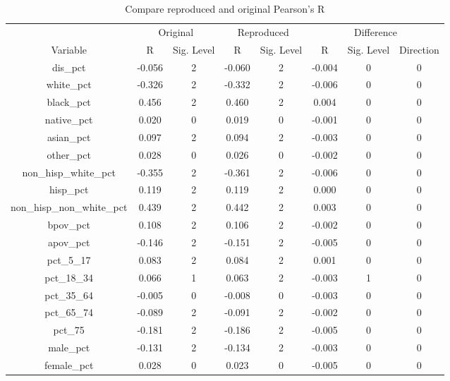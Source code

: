 \documentclass[
]{article}
\begin{document}
\begin{table}

\caption{\label{tab:compare-pearsons-correlation}Compare reproduced and original Pearson's R}
\centering
\begin{tabular}[t]{c|c|c|c|c|c|c|c}
\hline
\multicolumn{1}{c|}{ } & \multicolumn{2}{c|}{Original} & \multicolumn{2}{c|}{Reproduced} & \multicolumn{3}{c}{Difference} \\
\cline{2-3} \cline{4-5} \cline{6-8}
Variable & R & Sig. Level & R & Sig. Level & R & Sig. Level & Direction\\
\hline
dis\_pct & -0.056 & 2 & -0.060 & 2 & -0.004 & 0 & 0\\
\hline
white\_pct & -0.326 & 2 & -0.332 & 2 & -0.006 & 0 & 0\\
\hline
black\_pct & 0.456 & 2 & 0.460 & 2 & 0.004 & 0 & 0\\
\hline
native\_pct & 0.020 & 0 & 0.019 & 0 & -0.001 & 0 & 0\\
\hline
asian\_pct & 0.097 & 2 & 0.094 & 2 & -0.003 & 0 & 0\\
\hline
other\_pct & 0.028 & 0 & 0.026 & 0 & -0.002 & 0 & 0\\
\hline
non\_hisp\_white\_pct & -0.355 & 2 & -0.361 & 2 & -0.006 & 0 & 0\\
\hline
hisp\_pct & 0.119 & 2 & 0.119 & 2 & 0.000 & 0 & 0\\
\hline
non\_hisp\_non\_white\_pct & 0.439 & 2 & 0.442 & 2 & 0.003 & 0 & 0\\
\hline
bpov\_pct & 0.108 & 2 & 0.106 & 2 & -0.002 & 0 & 0\\
\hline
apov\_pct & -0.146 & 2 & -0.151 & 2 & -0.005 & 0 & 0\\
\hline
pct\_5\_17 & 0.083 & 2 & 0.084 & 2 & 0.001 & 0 & 0\\
\hline
pct\_18\_34 & 0.066 & 1 & 0.063 & 2 & -0.003 & 1 & 0\\
\hline
pct\_35\_64 & -0.005 & 0 & -0.008 & 0 & -0.003 & 0 & 0\\
\hline
pct\_65\_74 & -0.089 & 2 & -0.091 & 2 & -0.002 & 0 & 0\\
\hline
pct\_75 & -0.181 & 2 & -0.186 & 2 & -0.005 & 0 & 0\\
\hline
male\_pct & -0.131 & 2 & -0.134 & 2 & -0.003 & 0 & 0\\
\hline
female\_pct & 0.028 & 0 & 0.023 & 0 & -0.005 & 0 & 0\\
\hline
\end{tabular}
\end{table}
\end{document}
